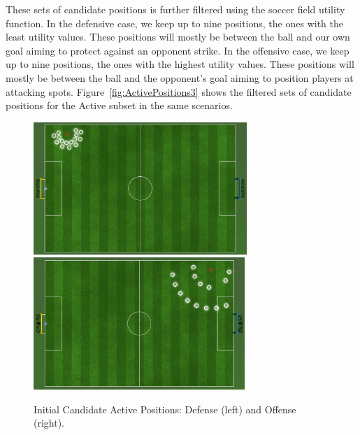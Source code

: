 These sets of candidate positions is further filtered using the soccer field utility function. In the defensive case, we keep up to nine positions, the ones with the least utility values. These positions will mostly be between the ball and our own goal aiming to protect against an opponent strike. In the offensive case, we keep up to nine positions, the ones with the highest utility values. These positions will mostly be between the ball and the opponent's goal aiming to position players at attacking spots. Figure~\ref{fig:ActivePositions3} shows the filtered sets of candidate positions for the Active subset in the same scenarios.

\begin{figure}[t!]
\centering
  \includegraphics[height=5cm, clip, trim=0cm 10cm 20cm 0cm]{Chapter4/figures/ActiveBefore(-8,6).png} \	
  \includegraphics[height=5cm, clip, trim=20cm 10cm 0cm 0cm]{Chapter4/figures/ActiveBefore(8,6).png}
  \caption{Initial Candidate Active Positions: Defense (left) and Offense (right).} 
  \label{fig:ActivePositions2}
\end{figure}

